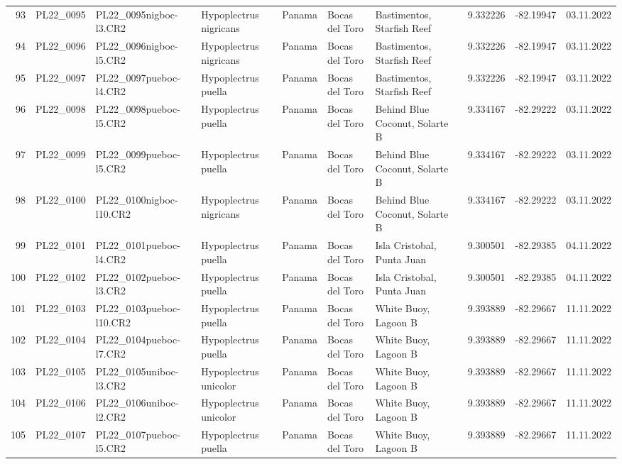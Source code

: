 \begin{table}[ht]
\begin{tabular}{rlllllllll}
  93 & PL22\_0095 & PL22\_0095nigboc-l3.CR2 & Hypoplectrus nigricans  & Panama & Bocas del Toro & Bastimentos, Starfish Reef & 9.332226 & -82.19947 & 03.11.2022 \\ 
  94 & PL22\_0096 & PL22\_0096nigboc-l5.CR2 & Hypoplectrus nigricans  & Panama & Bocas del Toro & Bastimentos, Starfish Reef & 9.332226 & -82.19947 & 03.11.2022 \\ 
  95 & PL22\_0097 & PL22\_0097pueboc-l4.CR2 & Hypoplectrus puella & Panama & Bocas del Toro & Bastimentos, Starfish Reef & 9.332226 & -82.19947 & 03.11.2022 \\ 
  96 & PL22\_0098 & PL22\_0098pueboc-l5.CR2 & Hypoplectrus puella & Panama & Bocas del Toro & Behind Blue Coconut, Solarte B & 9.334167 & -82.29222 & 03.11.2022 \\ 
  97 & PL22\_0099 & PL22\_0099pueboc-l5.CR2 & Hypoplectrus puella & Panama & Bocas del Toro & Behind Blue Coconut, Solarte B & 9.334167 & -82.29222 & 03.11.2022 \\ 
  98 & PL22\_0100 & PL22\_0100nigboc-l10.CR2 & Hypoplectrus nigricans  & Panama & Bocas del Toro & Behind Blue Coconut, Solarte B & 9.334167 & -82.29222 & 03.11.2022 \\ 
  99 & PL22\_0101 & PL22\_0101pueboc-l4.CR2 & Hypoplectrus puella & Panama & Bocas del Toro & Isla Cristobal, Punta Juan & 9.300501 & -82.29385 & 04.11.2022 \\ 
  100 & PL22\_0102 & PL22\_0102pueboc-l3.CR2 & Hypoplectrus puella & Panama & Bocas del Toro & Isla Cristobal, Punta Juan & 9.300501 & -82.29385 & 04.11.2022 \\ 
  101 & PL22\_0103 & PL22\_0103pueboc-l10.CR2 & Hypoplectrus puella & Panama & Bocas del Toro & White Buoy, Lagoon B & 9.393889 & -82.29667 & 11.11.2022 \\ 
  102 & PL22\_0104 & PL22\_0104pueboc-l7.CR2 & Hypoplectrus puella & Panama & Bocas del Toro & White Buoy, Lagoon B & 9.393889 & -82.29667 & 11.11.2022 \\ 
  103 & PL22\_0105 & PL22\_0105uniboc-l3.CR2 & Hypoplectrus unicolor & Panama & Bocas del Toro & White Buoy, Lagoon B & 9.393889 & -82.29667 & 11.11.2022 \\ 
  104 & PL22\_0106 & PL22\_0106uniboc-l2.CR2 & Hypoplectrus unicolor & Panama & Bocas del Toro & White Buoy, Lagoon B & 9.393889 & -82.29667 & 11.11.2022 \\ 
  105 & PL22\_0107 & PL22\_0107pueboc-l5.CR2 & Hypoplectrus puella & Panama & Bocas del Toro & White Buoy, Lagoon B & 9.393889 & -82.29667 & 11.11.2022 \\ 

\end{tabular}
\end{table}
